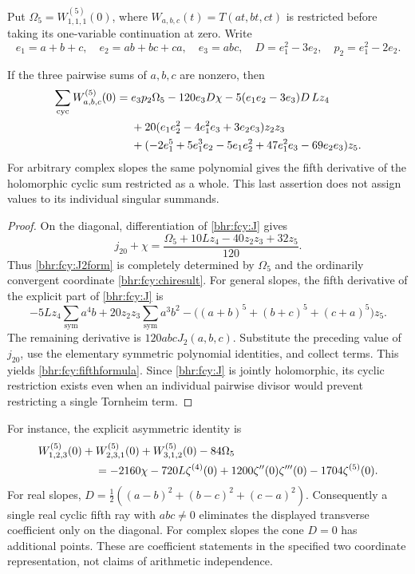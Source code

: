 Put \(\Omega_5=W_{1,1,1}^{(5)}(0)\), where
\(W_{a,b,c}(t)=T(at,bt,ct)\) is restricted before taking its
one-variable continuation at zero. Write
\[
 e_1=a+b+c,\quad e_2=ab+bc+ca,\quad e_3=abc,\quad
 D=e_1^2-3e_2,\quad p_2=e_1^2-2e_2.
\]

\begin{theorem}\label{bhr:fcy:fifth}
If the three pairwise sums of \(a,b,c\) are nonzero, then
\begin{align}
 \sum_{\mathrm{cyc}}W_{a,b,c}^{(5)}(0)={}&
 e_3p_2\Omega_5-120e_3D\chi
 -5(e_1e_2-3e_3)D\,Lz_4\notag\\
 &+20(e_1e_2^2-4e_1^2e_3+3e_2e_3)z_2z_3\notag\\
 &+(-2e_1^5+5e_1^3e_2-5e_1e_2^2
                         +47e_1^2e_3-69e_2e_3)z_5.
 \label{bhr:fcy:fifthformula}
\end{align}
For arbitrary complex slopes the same polynomial gives the fifth
derivative of the holomorphic cyclic sum restricted as a whole.
This last assertion does not assign values to its individual
singular summands.
\end{theorem}

\begin{proof}
On the diagonal, differentiation of \eqref{bhr:fcy:J} gives
\[
 j_{20}+\chi=\frac{
 \Omega_5+10Lz_4-40z_2z_3+32z_5}{120}.
\]
Thus \eqref{bhr:fcy:J2form} is completely determined by
\(\Omega_5\) and the ordinarily convergent coordinate
\eqref{bhr:fcy:chiresult}. For general slopes, the fifth derivative
of the explicit part of \eqref{bhr:fcy:J} is
\[
 -5Lz_4\sum_{\mathrm{sym}}a^4b
 +20z_2z_3\sum_{\mathrm{sym}}a^3b^2
 -\bigl((a+b)^5+(b+c)^5+(c+a)^5\bigr)z_5.
\]
The remaining derivative is \(120abcJ_2(a,b,c)\).
Substitute the preceding value of \(j_{20}\), use the elementary
symmetric polynomial identities, and collect terms. This yields
\eqref{bhr:fcy:fifthformula}. Since \eqref{bhr:fcy:J} is jointly
holomorphic, its cyclic restriction exists even when an individual
pairwise divisor would prevent restricting a single Tornheim term.
\end{proof}

For instance, the explicit asymmetric identity is
\begin{align}
 &W_{1,2,3}^{(5)}(0)+W_{2,3,1}^{(5)}(0)+W_{3,1,2}^{(5)}(0)
       -84\Omega_5\notag\\
 &\hspace{18mm}=-2160\chi-720L\zeta^{(4)}(0)
       +1200\zeta''(0)\zeta'''(0)-1704\zeta^{(5)}(0).
 \label{bhr:fcy:example}
\end{align}
For real slopes, \(D=\tfrac12((a-b)^2+(b-c)^2+(c-a)^2)\).
Consequently a single real cyclic fifth ray with \(abc\ne0\)
eliminates the displayed transverse coefficient only on the
diagonal. For complex slopes the cone \(D=0\) has additional
points. These are coefficient statements in the specified two
coordinate representation, not claims of arithmetic independence.

